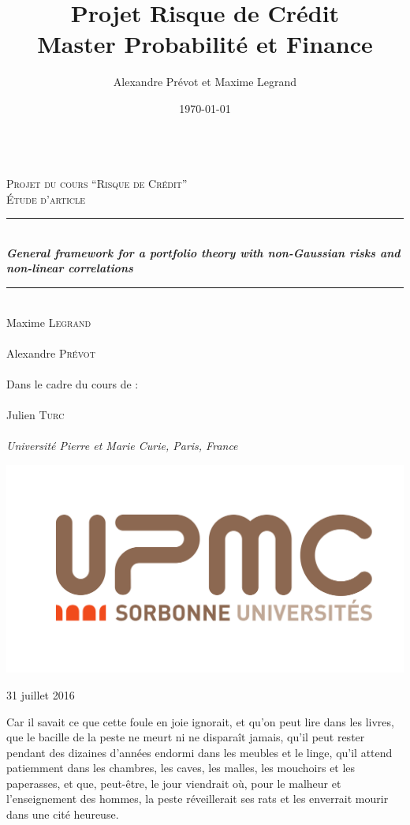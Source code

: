 \documentclass{article}
\title{\textbf{Projet Risque de Cr\'{e}dit \\
Master Probabilit\'{e} et Finance } 
}
\date{\today}
\author{Alexandre Pr\'evot et Maxime Legrand}
\newcommand{\HRule}{\rule{\linewidth}{0.5mm}}
\begin{document}
\begin{titlepage}
\begin{center}

~\\[1.5cm]
\textsc{\Large Projet du cours ``Risque de Crédit''\\
Étude d'article}\\[0.5cm]

\HRule \\[0.4cm]
\textit{ \huge \bfseries General framework for a portfolio theory with non-Gaussian risks and non-linear correlations}

\HRule \\[1cm]

{\large Maxime \textsc{Legrand}}\\
~\\
{\large Alexandre \textsc{Prévot}}\\
~\\[1cm]
{\large Dans le cadre du cours de :}\\
~\\
{\large Julien \textsc{Turc}}\\
~\\[1cm]
{\large \emph{Université Pierre et Marie Curie, Paris, France}}\\

\vfill

\includegraphics[height=0.44\textwidth]{static/logo_upmc.png}

\vfill

{\large 31 juillet 2016}
\end{center}
\end{titlepage}

\newsavebox{\auteurbm}
\newenvironment{Bonmot}[1]%
  {\small\slshape%
  \savebox{\auteurbm}{\upshape\sffamily#1}%
  \begin{flushright}}
  {\usebox{\auteurbm}
  \end{flushright}\normalsize\upshape}
 \begin{Bonmot}{La peste, Albert Camus}
  Car il savait ce que cette foule en joie ignorait, et qu'on peut lire dans les livres, que le bacille de la peste ne meurt ni ne disparaît jamais, qu'il peut rester pendant des dizaines d'années endormi dans les meubles et le linge, qu'il attend patiemment dans les chambres, les caves, les malles, les mouchoirs et les paperasses, et que, peut-être, le jour viendrait où, pour le malheur et l'enseignement des hommes, la peste réveillerait ses rats et les enverrait mourir dans une cité heureuse.
\end{Bonmot}
\end{document}
